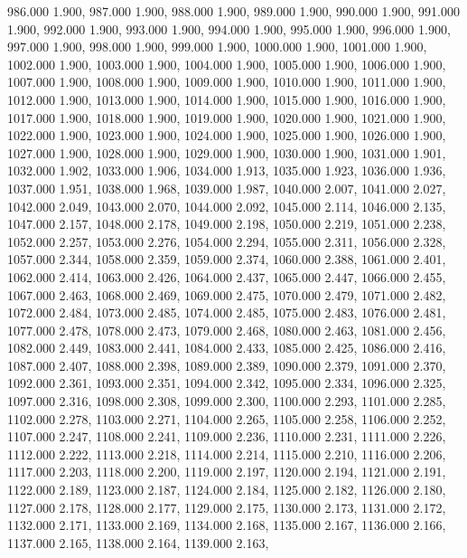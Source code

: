 986.000 1.900, 
987.000 1.900, 
988.000 1.900, 
989.000 1.900, 
990.000 1.900, 
991.000 1.900, 
992.000 1.900, 
993.000 1.900, 
994.000 1.900, 
995.000 1.900, 
996.000 1.900, 
997.000 1.900, 
998.000 1.900, 
999.000 1.900, 
1000.000 1.900, 
1001.000 1.900, 
1002.000 1.900, 
1003.000 1.900, 
1004.000 1.900, 
1005.000 1.900, 
1006.000 1.900, 
1007.000 1.900, 
1008.000 1.900, 
1009.000 1.900, 
1010.000 1.900, 
1011.000 1.900, 
1012.000 1.900, 
1013.000 1.900, 
1014.000 1.900, 
1015.000 1.900, 
1016.000 1.900, 
1017.000 1.900, 
1018.000 1.900, 
1019.000 1.900, 
1020.000 1.900, 
1021.000 1.900, 
1022.000 1.900, 
1023.000 1.900, 
1024.000 1.900, 
1025.000 1.900, 
1026.000 1.900, 
1027.000 1.900, 
1028.000 1.900, 
1029.000 1.900, 
1030.000 1.900, 
1031.000 1.901, 
1032.000 1.902, 
1033.000 1.906, 
1034.000 1.913, 
1035.000 1.923, 
1036.000 1.936, 
1037.000 1.951, 
1038.000 1.968, 
1039.000 1.987, 
1040.000 2.007, 
1041.000 2.027, 
1042.000 2.049, 
1043.000 2.070, 
1044.000 2.092, 
1045.000 2.114, 
1046.000 2.135, 
1047.000 2.157, 
1048.000 2.178, 
1049.000 2.198, 
1050.000 2.219, 
1051.000 2.238, 
1052.000 2.257, 
1053.000 2.276, 
1054.000 2.294, 
1055.000 2.311, 
1056.000 2.328, 
1057.000 2.344, 
1058.000 2.359, 
1059.000 2.374, 
1060.000 2.388, 
1061.000 2.401, 
1062.000 2.414, 
1063.000 2.426, 
1064.000 2.437, 
1065.000 2.447, 
1066.000 2.455, 
1067.000 2.463, 
1068.000 2.469, 
1069.000 2.475, 
1070.000 2.479, 
1071.000 2.482, 
1072.000 2.484, 
1073.000 2.485, 
1074.000 2.485, 
1075.000 2.483, 
1076.000 2.481, 
1077.000 2.478, 
1078.000 2.473, 
1079.000 2.468, 
1080.000 2.463, 
1081.000 2.456, 
1082.000 2.449, 
1083.000 2.441, 
1084.000 2.433, 
1085.000 2.425, 
1086.000 2.416, 
1087.000 2.407, 
1088.000 2.398, 
1089.000 2.389, 
1090.000 2.379, 
1091.000 2.370, 
1092.000 2.361, 
1093.000 2.351, 
1094.000 2.342, 
1095.000 2.334, 
1096.000 2.325, 
1097.000 2.316, 
1098.000 2.308, 
1099.000 2.300, 
1100.000 2.293, 
1101.000 2.285, 
1102.000 2.278, 
1103.000 2.271, 
1104.000 2.265, 
1105.000 2.258, 
1106.000 2.252, 
1107.000 2.247, 
1108.000 2.241, 
1109.000 2.236, 
1110.000 2.231, 
1111.000 2.226, 
1112.000 2.222, 
1113.000 2.218, 
1114.000 2.214, 
1115.000 2.210, 
1116.000 2.206, 
1117.000 2.203, 
1118.000 2.200, 
1119.000 2.197, 
1120.000 2.194, 
1121.000 2.191, 
1122.000 2.189, 
1123.000 2.187, 
1124.000 2.184, 
1125.000 2.182, 
1126.000 2.180, 
1127.000 2.178, 
1128.000 2.177, 
1129.000 2.175, 
1130.000 2.173, 
1131.000 2.172, 
1132.000 2.171, 
1133.000 2.169, 
1134.000 2.168, 
1135.000 2.167, 
1136.000 2.166, 
1137.000 2.165, 
1138.000 2.164, 
1139.000 2.163, 

